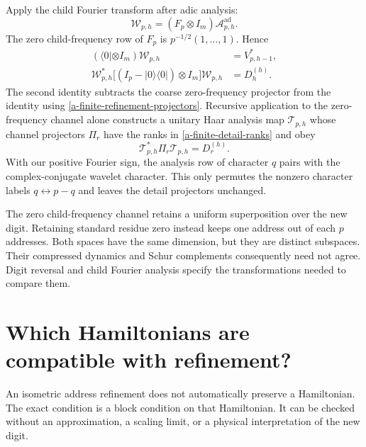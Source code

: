 Apply the child Fourier transform after adic analysis:
\begin{equation}
 \mathcal W_{p,h}=(F_p\otimes I_m)\mathcal A^{\mathrm{ad}}_{p,h}.
 \label{a-finite-child-fourier}
\end{equation}
The zero child-frequency row of $F_p$ is $p^{-1/2}(1,\ldots,1)$.
Hence
\begin{equation}
\begin{aligned}
 (\langle0|\otimes I_m)\mathcal W_{p,h}&=V_{p,h-1}^*,\\
 \mathcal W_{p,h}^*
 \bigl[(I_p-|0\rangle\langle0|)\otimes I_m\bigr]
 \mathcal W_{p,h}&=D_h^{(h)}.
\end{aligned}
\label{a-finite-child-detail}
\end{equation}
The second identity subtracts the coarse zero-frequency projector from
the identity using \eqref{a-finite-refinement-projectors}. Recursive
application to the zero-frequency channel alone constructs a unitary
Haar analysis map $\mathcal T_{p,h}$ whose channel projectors $\Pi_r$
have the ranks in \eqref{a-finite-detail-ranks} and obey
\begin{equation}
 \mathcal T_{p,h}^*\Pi_r\mathcal T_{p,h}=D_r^{(h)}.
 \label{a-finite-haar-analysis}
\end{equation}
With our positive Fourier sign, the analysis row of character $q$
pairs with the complex-conjugate wavelet character. This only permutes
the nonzero character labels $q\leftrightarrow p-q$ and leaves the
detail projectors unchanged.

The zero child-frequency channel retains a uniform superposition over
the new digit. Retaining standard residue zero instead keeps one
address out of each $p$ addresses. Both spaces have the same dimension,
but they are distinct subspaces. Their compressed dynamics and Schur
complements consequently need not agree. Digit reversal and child
Fourier analysis specify the transformations needed to compare them.



\section{Which Hamiltonians are compatible with refinement?}
\label{a-finite-hamiltonian}

An isometric address refinement does not automatically preserve a
Hamiltonian. The exact condition is a block condition on that
Hamiltonian. It can be checked without an approximation, a scaling
limit, or a physical interpretation of the new digit.

